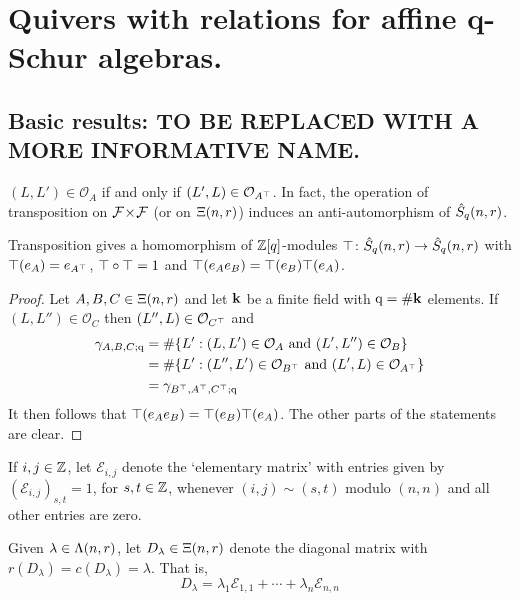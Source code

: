 \documentclass[a4paper, 11pt]{report}
\begin{document}
\chapter{Quivers with relations for affine q-Schur algebras.}


\section{Basic results: TO BE REPLACED WITH A MORE INFORMATIVE NAME.}

$(L,L')\in\mathcal{O}_A$ if and only if $(L',L)\in\mathcal{O}_{A^\top}$. In fact, the operation of transposition on ${\mathcal{F}\!\times\!\mathcal{F}}$ (or on $\Xi(n,r)$) induces an anti-automorphism of $\hat{S}_q(n,r)$.
\begin{lemma}
Transposition gives a homomorphism of $\mathbb{Z}[q]$-modules $\top\colon\hat{S}_q(n,r)\to\hat{S}_q(n,r)$ with $\top(e_A) = e_{A^\top}$, $\top\circ\top = 1$ and $\top(e_A e_B) = \top(e_B)\top(e_A)$.
\end{lemma}
\begin{proof}
Let $A,B,C\in\Xi(n,r)$ and let $\mathbf{k}$ be a finite field with $\mathrm{q}=\#\mathbf{k}$ elements. If $(L,L'')\in\mathcal{O}_C$ then $(L'',L)\in\mathcal{O}_{C^\top}$ and
\begin{align*}
\gamma_{A,B,C;\mathrm{q}}
&= \#\{L': (L,L')\in\mathcal{O}_A\text{ and } (L',L'')\in\mathcal{O}_B\}\\
&= \#\{L': (L'',L')\in\mathcal{O}_{B^\top}\text{ and } (L',L)\in\mathcal{O}_{A^\top}\}\\
&= \gamma_{B^\top,A^\top, C^\top;\mathrm{q}}
\end{align*}
It then follows that $\top(e_A e_B) = \top(e_B) \top(e_A)$. The other parts of the statements are clear.
\end{proof}

If $i,j\in\mathbb{Z}$, let $\mathcal{E}_{i,j}$ denote the `elementary matrix' with entries given by $(\mathcal{E}_{i,j})_{s,t}=1$, for $s,t\in\mathbb{Z}$,  whenever $(i,j)\sim (s,t)$ modulo $(n,n)$ and all other entries are zero.

Given $\lambda\in\Lambda(n,r)$, let $D_\lambda\in\Xi(n,r)$ denote the diagonal matrix with $r(D_\lambda)=c(D_\lambda) = \lambda$. That is,
\begin{equation*}
D_\lambda = \lambda_1 \mathcal{E}_{1,1} +\cdots + \lambda_n \mathcal{E}_{n,n}
\end{equation*}
\end{document}
